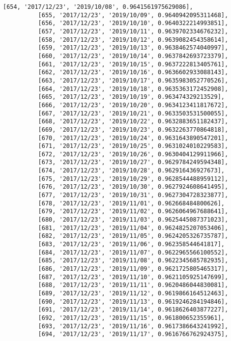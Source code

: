 \documentclass[11pt]{article}
\begin{document}
\begin{Verbatim}[commandchars=\\\{\}]
          [654, '2017/12/23', '2019/10/08', 0.9641561975629086],
          [655, '2017/12/23', '2019/10/09', 0.9640942095311468],
          [656, '2017/12/23', '2019/10/10', 0.9640322214993851],
          [657, '2017/12/23', '2019/10/11', 0.9639702334676232],
          [658, '2017/12/23', '2019/10/12', 0.9639082454358614],
          [659, '2017/12/23', '2019/10/13', 0.9638462574040997],
          [660, '2017/12/23', '2019/10/14', 0.9637842693723379],
          [661, '2017/12/23', '2019/10/15', 0.9637222813405761],
          [662, '2017/12/23', '2019/10/16', 0.9636602933088143],
          [663, '2017/12/23', '2019/10/17', 0.9635983052770526],
          [664, '2017/12/23', '2019/10/18', 0.9635363172452908],
          [665, '2017/12/23', '2019/10/19', 0.963474329213529],
          [666, '2017/12/23', '2019/10/20', 0.9634123411817672],
          [667, '2017/12/23', '2019/10/21', 0.9633503531500055],
          [668, '2017/12/23', '2019/10/22', 0.9632883651182437],
          [669, '2017/12/23', '2019/10/23', 0.9632263770864818],
          [670, '2017/12/23', '2019/10/24', 0.9631643890547201],
          [671, '2017/12/23', '2019/10/25', 0.9631024010229583],
          [672, '2017/12/23', '2019/10/26', 0.9630404129911966],
          [673, '2017/12/23', '2019/10/27', 0.9629784249594348],
          [674, '2017/12/23', '2019/10/28', 0.962916436927673],
          [675, '2017/12/23', '2019/10/29', 0.9628544488959112],
          [676, '2017/12/23', '2019/10/30', 0.9627924608641495],
          [677, '2017/12/23', '2019/10/31', 0.9627304728323877],
          [678, '2017/12/23', '2019/11/01', 0.962668484800626],
          [679, '2017/12/23', '2019/11/02', 0.9626064967688641],
          [680, '2017/12/23', '2019/11/03', 0.9625445087371023],
          [681, '2017/12/23', '2019/11/04', 0.9624825207053406],
          [682, '2017/12/23', '2019/11/05', 0.9624205326735787],
          [683, '2017/12/23', '2019/11/06', 0.962358544641817],
          [684, '2017/12/23', '2019/11/07', 0.9622965566100552],
          [685, '2017/12/23', '2019/11/08', 0.9622345685782935],
          [686, '2017/12/23', '2019/11/09', 0.9621725805465317],
          [687, '2017/12/23', '2019/11/10', 0.9621105925147699],
          [688, '2017/12/23', '2019/11/11', 0.9620486044830081],
          [689, '2017/12/23', '2019/11/12', 0.9619866164512463],
          [690, '2017/12/23', '2019/11/13', 0.9619246284194846],
          [691, '2017/12/23', '2019/11/14', 0.9618626403877227],
          [692, '2017/12/23', '2019/11/15', 0.961800652355961],
          [693, '2017/12/23', '2019/11/16', 0.9617386643241992],
          [694, '2017/12/23', '2019/11/17', 0.9616766762924375],

\end{Verbatim}
\end{document}
